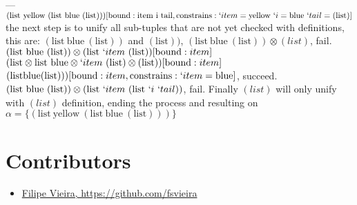\documentclass[11pt,a4paper]{report}
\newcommand{\var}[1]{`#1}
\newcommand{\unify}{\otimes}
\begin{document}
\begin{enumerate}
\subitem ---
\subitem $(\text{list}\ \text{yellow}\ (\text{list}\ \text{blue}\ (\text{list})))
[\text{bound}: \text{item}\ \text{i}\ \text{tail}, \text{constrains}: \var{item} = \text{yellow}\ \var{i}=\text{blue}\ \var{tail}=(\text{list})]$
\subitem the next step is to unify all sub-tuples that are not yet checked with definitions, this are: $(\text{list}\ \text{blue}\ (\text{list}))$ and $(\text{list}))$,
\subitem $(\text{list}\ \text{blue}\ (\text{list})) \unify (list)$, fail.
\subitem $(\text{list}\ \text{blue}\ (\text{list})) \unify (\text{list}\ \var{item}\ (\text{list}))[\text{bound}: item]$
\subitem $(\text{list}\unify \text{list}\ \text{blue}\unify \var{item}\ (\text{list}) \unify (\text{list}))[\text{bound}: item]$
\subitem $(\text{list} \text{blue} (\text{list})))[\text{bound}: item, \text{constrains}: \var{item}=\text{blue}]$, succeed.
\subitem $(\text{list}\ \text{blue}\ (\text{list})) \unify (\text{list}\ \var{item}\ (\text{list}\ \var{i}\ \var{tail}))$, fail.
\subitem Finally $(list)$ will only unify with $(list)$ definition, ending the process and resulting on $\alpha = \{ (\text{list}\ \text{yellow}\ (\text{list}\ \text{blue}\ (\text{list}))) \}$
\end{enumerate}



\section{Contributors}
\label{sec:contributors}

\begin{itemize}
    \item \href{https://github.com/fsvieira}{Filipe Vieira, https://github.com/fsvieira}
\end{itemize}
\end{document}
